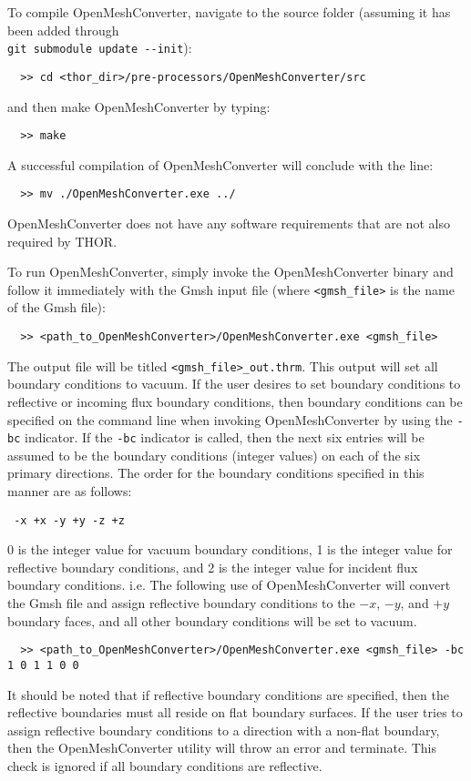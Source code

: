 To compile OpenMeshConverter, navigate to the source folder (assuming it has been added through \\
\verb"git submodule update --init"):
\begin{verbatim}
  >> cd <thor_dir>/pre-processors/OpenMeshConverter/src
\end{verbatim}
and then make OpenMeshConverter by typing:
\begin{verbatim}
  >> make
\end{verbatim}
A successful compilation of OpenMeshConverter will conclude with the line:
\begin{verbatim}
  >> mv ./OpenMeshConverter.exe ../
\end{verbatim}
OpenMeshConverter does not have any software requirements that are not also required by \ac{THOR}.

To run OpenMeshConverter, simply invoke the OpenMeshConverter binary and follow it immediately with the Gmsh input file (where \verb"<gmsh_file>" is the name of the Gmsh file):
\begin{verbatim}
  >> <path_to_OpenMeshConverter>/OpenMeshConverter.exe <gmsh_file>
\end{verbatim}
The output file will be titled \verb"<gmsh_file>_out.thrm".
This output will set all boundary conditions to vacuum.
If the user desires to set boundary conditions to reflective or incoming flux boundary conditions, then boundary conditions can be specified on the command line when invoking OpenMeshConverter by using the \verb"-bc" indicator.
If the \verb"-bc" indicator is called, then the next six entries will be assumed to be the boundary conditions (integer values) on each of the six primary directions.
The order for the boundary conditions specified in this manner are as follows:
\begin{verbatim}
 -x +x -y +y -z +z
\end{verbatim}
0 is the integer value for vacuum boundary conditions, 1 is the integer value for reflective boundary conditions, and 2 is the integer value for incident flux boundary conditions.
i.e. The following use of OpenMeshConverter will convert the Gmsh file and assign reflective boundary conditions to the $-x$, $-y$, and $+y$ boundary faces, and all other boundary conditions will be set to vacuum.
\begin{verbatim}
  >> <path_to_OpenMeshConverter>/OpenMeshConverter.exe <gmsh_file> -bc 1 0 1 1 0 0
\end{verbatim}
It should be noted that if reflective boundary conditions are specified, then the reflective boundaries must all reside on flat boundary surfaces.
If the user tries to assign reflective boundary conditions to a direction with a non-flat boundary, then the OpenMeshConverter utility will throw an error and terminate.
This check is ignored if all boundary conditions are reflective.

